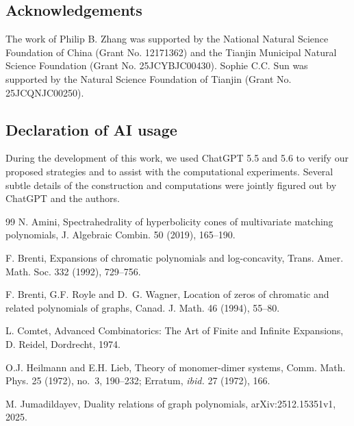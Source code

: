 \documentclass[12pt,a4paper,reqno]{amsart}
\numberwithin{equation}{section}
\theoremstyle{definition}
\theoremstyle{remark}
\begin{document}
 \subsection*{Acknowledgements}
The work of Philip B. Zhang was supported by the National Natural Science Foundation of China (Grant No. 12171362) and the Tianjin Municipal Natural Science Foundation (Grant No. 25JCYBJC00430). Sophie C.C. Sun was supported by the Natural Science Foundation of Tianjin (Grant No. 25JCQNJC00250).



\subsection*{Declaration of AI usage}

During the development of this work, we used ChatGPT 5.5 and 5.6 to verify our proposed strategies and to assist with the computational experiments. Several subtle details of the construction and computations were jointly figured out  by ChatGPT and the authors. 

\begin{thebibliography}{99}
N. Amini,
{Spectrahedrality of hyperbolicity cones of multivariate matching
polynomials},
J. Algebraic Combin. {50} (2019), 165--190.
 

F. Brenti,
{Expansions of chromatic polynomials and log-concavity},
Trans. Amer. Math. Soc. {332} (1992),   729--756.
 

F. Brenti, G.F. Royle and D.~G. Wagner,
 {Location of zeros of chromatic and related polynomials of graphs},
Canad. J. Math. {46} (1994),  55--80. 
 




L. Comtet,
 {Advanced Combinatorics: The Art of Finite and Infinite Expansions},
D. Reidel, Dordrecht, 1974.

 

O.J. Heilmann and E.H. Lieb,
 {Theory of monomer-dimer systems},
Comm. Math. Phys. {25} (1972), no.~3, 190--232;
Erratum, \emph{ibid.} {27} (1972), 166. 

M. Jumadildayev,
 {Duality relations of graph polynomials},
arXiv:2512.15351v1, 2025. 

 
 
\end{thebibliography}
\end{document}
